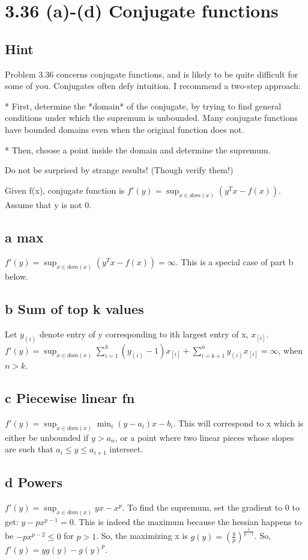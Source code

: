 \documentclass{article}
\begin{document}
\section{3.36 (a)-(d) Conjugate functions}
\subsection{Hint}
Problem 3.36 concerns conjugate functions, and is likely to be quite difficult for some of you. Conjugates often defy intuition. I recommend a two-step approach:

    * First, determine the *domain* of the conjugate, by trying to find general conditions under which the supremum is unbounded. Many conjugate functions have bounded domains even when the original function does not.
    
    * Then, choose a point inside the domain and determine the supremum. 

Do not be surprised by strange results! (Though verify them!)

\begin{notation}
Given f(x), conjugate function is $f'(y) = \sup_{x \in dom(x)} (y^{T}x - f(x))$. Assume that y is not 0.

\end{notation}

\subsection{a max}
$f'(y) = \sup_{x \in dom(x)} (y^{T}x - f(x)) = \infty$. This is a special case of part b below.

\subsection{b Sum of top k values}
Let $y_{(i)}$ denote entry of y corresponding to ith largest entry of x, $x_{[i]}$. $f'(y) = \sup_{x \in dom(x)} \sum_{i=1}^k (y_{(i)} - 1)x_{[i]} + \sum_{i=k+1}^n y_{(i)}x_{[i]} = \infty$, when $n > k$.

\subsection{c Piecewise linear fn}
$f'(y) = \sup_{x \in dom(x)} \min_i (y - a_i)x - b_i$. This will correspond to x which is either be unbounded if $y >a_n$, or a point where two linear pieces whose slopes are such that $a_i \leq y \leq a_{i+1}$ intersect.

\subsection{d Powers}
$f'(y) = \sup_{x \in dom(x)} yx - x^{p}$. To find the supremum, set the gradient to 0 to get: $y - px^{p-1} = 0$. This is indeed the maximum because the hessian happens to be $-px^{p-2} \leq 0$ for $p>1$. So, the maximizing x is $g(y) = (\frac{y}{p})^{\frac{1}{p-1}}$. So, $f'(y) = yg(y) - g(y)^{p}$.
\end{document}
